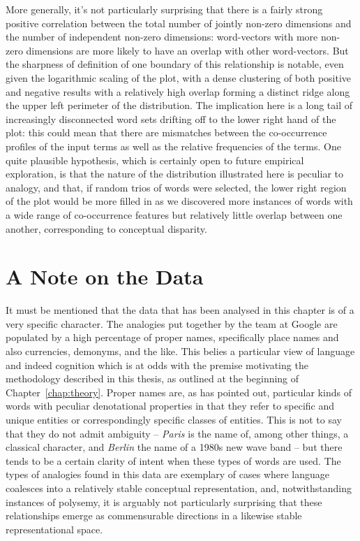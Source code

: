 More generally, it's not particularly surprising that there is a fairly strong positive correlation between the total number of jointly non-zero dimensions and the number of independent non-zero dimensions: word-vectors with more non-zero dimensions are more likely to have an overlap with other word-vectors.  But the sharpness of definition of one boundary of this relationship is notable, even given the logarithmic scaling of the plot, with a dense clustering of both positive and negative results with a relatively high overlap forming a distinct ridge along the upper left perimeter of the distribution.  The implication here is a long tail of increasingly disconnected word sets drifting off to the lower right hand of the plot: this could mean that there are mismatches between the co-occurrence profiles of the input terms as well as the relative frequencies of the terms.  One quite plausible hypothesis, which is certainly open to future empirical exploration, is that the nature of the distribution illustrated here is peculiar to analogy, and that, if random trios of words were selected, the lower right region of the plot would be more filled in as we discovered more instances of words with a wide range of co-occurrence features but relatively little overlap between one another, corresponding to conceptual disparity.

\section{A Note on the Data} \label{sec:datanote}
It must be mentioned that the data that has been analysed in this chapter is of a very specific character.  The analogies put together by the team at Google are populated by a high percentage of proper names, specifically place names and also currencies, demonyms, and the like.  This belies a particular view of language and indeed cognition which is at odds with the premise motivating the methodology described in this thesis, as outlined at the beginning of Chapter~\ref{chap:theory}.  Proper names are, as \cite{Russell1905} has pointed out, particular kinds of words with peculiar denotational properties in that they refer to specific and unique entities or correspondingly specific classes of entities.  This is not to say that they do not admit ambiguity -- \emph{Paris} is the name of, among other things, a classical character, and \emph{Berlin} the name of a 1980s new wave band -- but there tends to be a certain clarity of intent when these types of words are used.  The types of analogies found in this data are exemplary of cases where language coalesces into a relatively stable conceptual representation, and, notwithstanding instances of polysemy, it is arguably not particularly surprising that these relationships emerge as commensurable directions in a likewise stable representational space.

